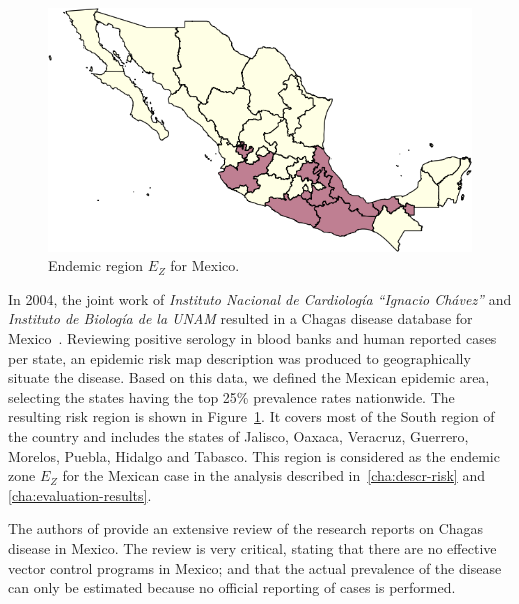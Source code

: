 \begin{figure}[h!]
\centering
\includegraphics[width=0.75\linewidth]
{figures/Ambientes_Gran_Chaco-Mexico1/Ambientes_Gran_Chaco-Mexico1.png}
\caption{Endemic region $E_Z$ for Mexico.}
\label{fig:endemic_zone_mexico}
\end{figure}

In 2004, the joint work of \textit{Instituto Nacional de Cardiología ``Ignacio Chávez''} and  \textit{Instituto de Biología de la UNAM} resulted in a Chagas disease database for Mexico~\textcite{cruz2006chagmex}. Reviewing positive serology in blood banks and human reported cases per state, an epidemic risk map description was produced to geographically situate the disease. Based on this data, we defined the Mexican epidemic area, selecting the states having the top 25\% prevalence rates nationwide. The resulting risk region is shown in Figure~\cref{fig:endemic_zone_mexico}. It covers most of the South region of the country and includes the states of Jalisco, Oaxaca, Veracruz, Guerrero, Morelos, Puebla, Hidalgo and Tabasco.
This region is considered as the endemic zone $E_Z$ for the Mexican case in the analysis described in~\cref{cha:descr-risk} and \cref{cha:evaluation-results}.



The authors of  \textcite{carabarin2013chagas} provide an extensive review of the
research reports on Chagas disease in Mexico.
The review is very critical, stating that there are no effective vector control programs in Mexico;
and that the actual prevalence of the disease
can only be estimated because no official reporting of cases is performed.

